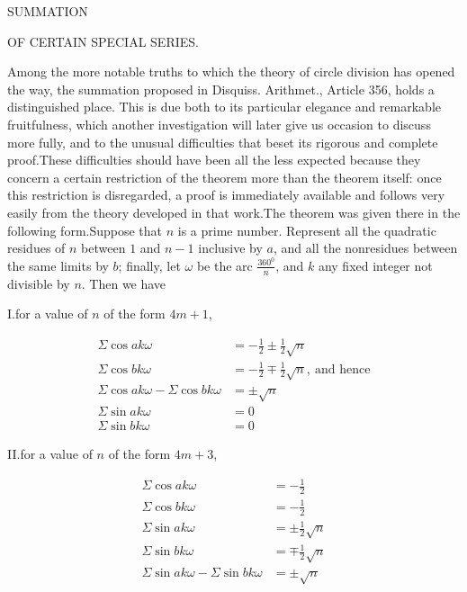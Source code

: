 \begin{center}\Large SUMMATION\end{center}

\begin{center}\large OF CERTAIN SPECIAL SERIES.\end{center}

\BookRule{22mm}


Among the more notable truths to which the theory of circle division has opened the way, the summation proposed in Disquiss. Arithmet., Article 356, holds a distinguished place. This is due both to its particular elegance and remarkable fruitfulness, which another investigation will later give us occasion to discuss more fully, and to the unusual difficulties that beset its rigorous and complete proof.\quad These difficulties should have been all the less expected because they concern a certain restriction of the theorem more than the theorem itself: once this restriction is disregarded, a proof is immediately available and follows very easily from the theory developed in that work.\quad The theorem was given there in the following form.\quad Suppose that $n$ is a prime number. Represent all the quadratic residues of $n$ between $1$ and $n-1$ inclusive by $a$, and all the nonresidues between the same limits by $b$; finally, let $\omega$ be the arc $\frac{360^{0}}{n}$, and $k$ any fixed integer not divisible by $n$. Then we have

I.\quad for a value of $n$ of the form $4m+1$,

\[
\begin{aligned}
\Sigma\cos ak\omega&=-\tfrac12\pm\tfrac12\surd n\\
\Sigma\cos bk\omega&=-\tfrac12\mp\tfrac12\surd n,\ \text{and hence}\\
\Sigma\cos ak\omega-\Sigma\cos bk\omega&=\pm\surd n\\
\Sigma\sin ak\omega&=0\\
\Sigma\sin bk\omega&=0
\end{aligned}
\]

II.\quad for a value of $n$ of the form $4m+3$,

\[
\begin{aligned}
\Sigma\cos ak\omega&=-\tfrac12\\
\Sigma\cos bk\omega&=-\tfrac12\\
\Sigma\sin ak\omega&=\pm\tfrac12\surd n\\
\Sigma\sin bk\omega&=\mp\tfrac12\surd n\\
\Sigma\sin ak\omega-\Sigma\sin bk\omega&=\pm\surd n
\end{aligned}
\]

